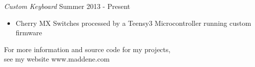\documentclass[line,margin]{res}
\newenvironment{tightcenter}{%
  \setlength\topsep{0pt}
  \setlength\parskip{0pt}
  \begin{center}
}{%
  \end{center}
}
\begin{document}
\begin{resume}
                {\sl Custom Keyboard} \hfill Summer 2013 - Present
                \begin{itemize}  \itemsep -2pt %
                    \item Cherry MX Switches processed by a Teensy3 Microcontroller running custom firmware \\[2ex]
                \end{itemize}

                \begin{tightcenter}
                For more information and source code for my projects,\\
                see my website www.maddene.com
                \end{tightcenter}

\end{resume}
\end{document}
